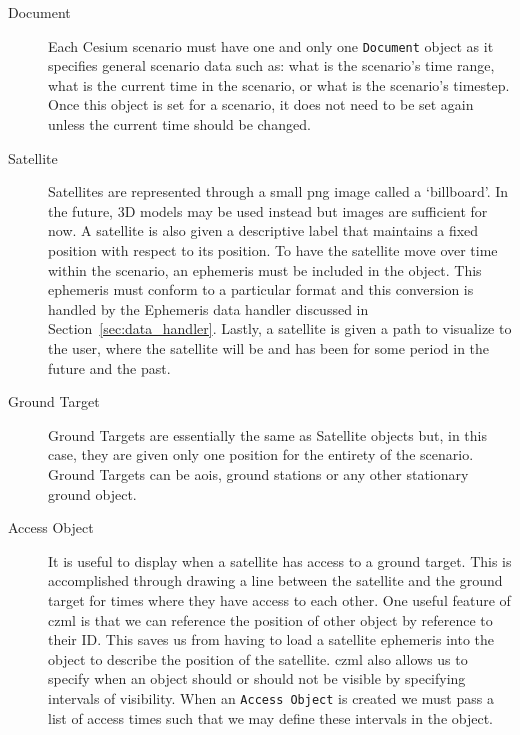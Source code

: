 \begin{description} 

    \item[Document] Each Cesium scenario must have one and only one
	\texttt{Document} object as it specifies general scenario data such as:
	what is the scenario's time range, what is the current time in the
	scenario, or what is the scenario's timestep. Once this object is set
	for a scenario, it does not need to be set again unless the current
	time should be changed.

    \item[Satellite] Satellites are represented through a small \gls{png} image
	called a `billboard'. In the future, 3D models may be used instead but
	images are sufficient for now. A satellite is also given a descriptive
	label that maintains a fixed position with respect to its position. To
	have the satellite move over time within the scenario, an ephemeris
	must be included in the object.  This ephemeris must conform to a
	particular format and this conversion is handled by the Ephemeris data
	handler discussed in Section~\ref{sec:data_handler}.  Lastly, a
	satellite is given a path to visualize to the user, where the satellite
	will be and has been for some period in the future and the past.

    \item[Ground Target] Ground Targets are essentially the same as Satellite
	objects but, in this case, they are given only one position for the
	entirety of the scenario. Ground Targets can be \glspl{aoi}, ground
	stations or any other stationary ground object.

    \item[Access Object] It is useful to display when a satellite has access to
	a ground target. This is accomplished through drawing a line between
	the satellite and the ground target for times where they have access to
	each other. One useful feature of \gls{czml} is that we can reference
	the position of other object by reference to their ID. This saves us
	from having to load a satellite ephemeris into the object to describe
	the position of the satellite. \gls{czml} also allows us to specify
	when an object should or should not be visible by specifying intervals
	of visibility. When an \texttt{Access Object} is created we must pass a
	list of access times such that we may define these intervals in the
	object.


\end{description}
